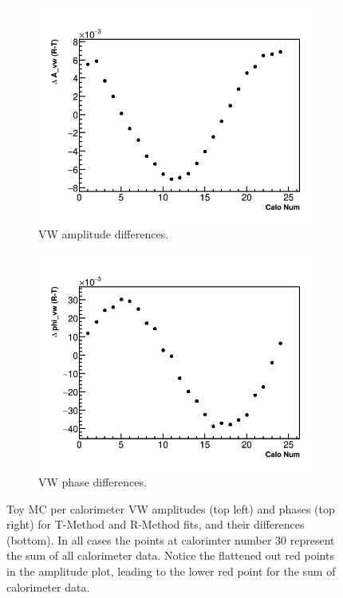 \documentclass[12pt,letterpaper]{article}
\begin{document}
\begin{figure}[]
    \begin{subfigure}[t]{0.45\textwidth}
        \centering
        \includegraphics[width=\textwidth]{JamesMC_Avw_Diff}
        \caption{VW amplitude differences.}
    \end{subfigure}%
    \hspace{5mm}
    \begin{subfigure}[t]{0.45\textwidth}
        \centering
        \includegraphics[width=\textwidth]{JamesMC_Phivw_Diff}
        \caption{VW phase differences.}
    \end{subfigure}
\caption[]{Toy MC per calorimeter VW amplitudes (top left) and phases (top right) for T-Method and R-Method fits, and their differences (bottom). In all cases the points at calorimter number 30 represent the sum of all calorimeter data. Notice the flattened out red points in the amplitude plot, leading to the lower red point for the sum of calorimeter data.}
\label{fig:ToyMC_VW_calo_noRand}
\end{figure}
\end{document}

